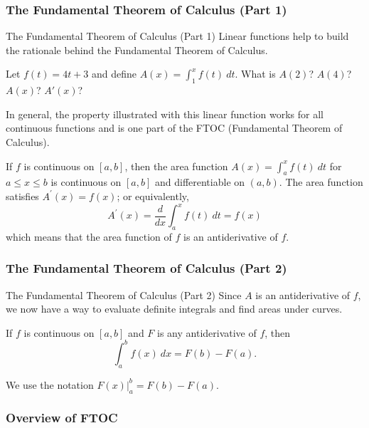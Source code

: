 \documentclass[cal1spr16Lectures.tex]{subfiles}
\begin{document}
\subsubsection{The Fundamental Theorem of Calculus (Part 1)}

\begin{frame}{\small The Fundamental Theorem of Calculus (Part 1)}
Linear functions help to build the rationale behind the Fundamental Theorem of Calculus.
\begin{ex}
Let $f(t)=4t+3$ and define $A(x)=\int_1^xf(t)\ dt$.  What is $A(2)$? $A(4)$? $A(x)$? $A'(x)$?
\end{ex}
In general, the property illustrated with this linear function works for all continuous functions and is one part of the FTOC (Fundamental Theorem of Calculus).
\end{frame}

\begin{frame}\small
\begin{thm}[FTOC I] If $f$ is continuous on $[a,b]$, then the area function $A(x)=\int_a^x f(t)\ dt$ for $a \le x \le b$ is continuous on $[a,b]$ and differentiable on $(a,b)$.  The area function satisfies $A^{\prime}(x)=f(x)$; or equivalently, 
\[
A^{\prime}(x)=\frac{d}{dx} \int_a^x f(t)\ dt = f(x)
\]
which means that the area function of $f$ is an antiderivative of $f$.
\end{thm}
\end{frame}

\subsubsection{The Fundamental Theorem of Calculus (Part 2)}

\begin{frame}{\small The Fundamental Theorem of Calculus (Part 2)}\small
Since $A$ is an antiderivative of $f$, we now have a way to evaluate definite integrals and find areas under curves.
\begin{thm}[FTOC II] 
If $f$ is continuous on $[a,b]$ and $F$ is any antiderivative of $f$, then
\[\int_a^b f(x)\ dx = F(b)-F(a).\]
\end{thm}
%
We use the notation $F(x) \vert_a^b = F(b)-F(a)$.
\end{frame}

\subsubsection{Overview of FTOC}
\end{document}
